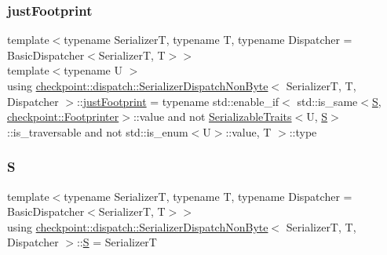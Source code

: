 \mbox{\label{structcheckpoint_1_1dispatch_1_1_serializer_dispatch_non_byte_a162005f14e0a0cf2f3df64c2d9ec4d9e}} 
\subsubsection{\texorpdfstring{just\+Footprint}{justFootprint}}
{\footnotesize\ttfamily template$<$typename SerializerT, typename T, typename Dispatcher = Basic\+Dispatcher$<$\+Serializer\+T, T$>$$>$ \\
template$<$typename U $>$ \\
using \hyperlink{structcheckpoint_1_1dispatch_1_1_serializer_dispatch_non_byte}{checkpoint\+::dispatch\+::\+Serializer\+Dispatch\+Non\+Byte}$<$ SerializerT, T, Dispatcher $>$\+::\hyperlink{structcheckpoint_1_1dispatch_1_1_serializer_dispatch_non_byte_a162005f14e0a0cf2f3df64c2d9ec4d9e}{just\+Footprint} =  typename std\+::enable\+\_\+if$<$ std\+::is\+\_\+same$<$\hyperlink{structcheckpoint_1_1dispatch_1_1_serializer_dispatch_non_byte_a456d0c02fc35667989d79ddbb0393776}{S}, \hyperlink{structcheckpoint_1_1_footprinter}{checkpoint\+::\+Footprinter}$>$\+::value and not \hyperlink{structcheckpoint_1_1_serializable_traits}{Serializable\+Traits}$<$U, \hyperlink{structcheckpoint_1_1dispatch_1_1_serializer_dispatch_non_byte_a456d0c02fc35667989d79ddbb0393776}{S}$>$\+::is\+\_\+traversable and not std\+::is\+\_\+enum$<$U$>$\+::value, T $>$\+::type}

\mbox{\label{structcheckpoint_1_1dispatch_1_1_serializer_dispatch_non_byte_a456d0c02fc35667989d79ddbb0393776}} 
\subsubsection{\texorpdfstring{S}{S}}
{\footnotesize\ttfamily template$<$typename SerializerT, typename T, typename Dispatcher = Basic\+Dispatcher$<$\+Serializer\+T, T$>$$>$ \\
using \hyperlink{structcheckpoint_1_1dispatch_1_1_serializer_dispatch_non_byte}{checkpoint\+::dispatch\+::\+Serializer\+Dispatch\+Non\+Byte}$<$ SerializerT, T, Dispatcher $>$\+::\hyperlink{structcheckpoint_1_1dispatch_1_1_serializer_dispatch_non_byte_a456d0c02fc35667989d79ddbb0393776}{S} =  SerializerT}



